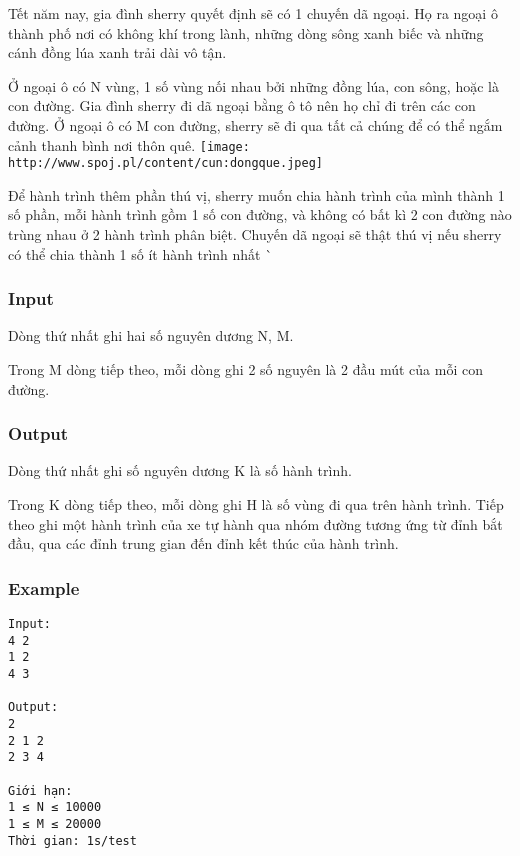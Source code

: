 



   Tết năm nay, gia đình sherry quyết định sẽ có 1 chuyến dã ngoại. Họ ra ngoại ô thành phố nơi có không khí trong lành, những dòng sông xanh biếc và những cánh đồng lúa xanh trải dài vô tận.  

   Ở ngoại ô có N vùng, 1 số vùng nối nhau bởi những đồng lúa, con sông, hoặc là con đường. Gia đình sherry đi dã ngoại bằng ô tô nên họ chỉ đi trên các con đường. Ở ngoại ô có M con đường, sherry sẽ đi qua tất cả chúng để có thể ngắm cảnh thanh bình nơi thôn quê.  
\texttt{[image: http://www.spoj.pl/content/cun:dongque.jpeg]}

   Để hành trình thêm phần thú vị, sherry muốn chia hành trình của mình thành 1 số phần, mỗi hành trình gồm 1 số con đường, và không có bất kì 2 con đường nào trùng nhau ở 2 hành trình phân biệt. Chuyến dã ngoại sẽ thật thú vị nếu sherry có thể chia thành 1 số ít hành trình nhất ^^  

\subsubsection{   Input  }

   Dòng thứ nhất ghi hai số nguyên dương N, M.  

   Trong M dòng tiếp theo, mỗi dòng ghi 2 số nguyên là 2 đầu mút của mỗi con đường.  

\subsubsection{   Output  }

   Dòng thứ nhất ghi số nguyên dương K là số hành trình.  

   Trong K dòng tiếp theo, mỗi dòng ghi H là số vùng đi qua trên hành trình. Tiếp theo ghi một hành trình của xe tự hành qua nhóm đường tương ứng từ đỉnh bắt đầu, qua các đỉnh trung gian đến đỉnh kết thúc của hành trình.  

\subsubsection{   Example  }
\begin{verbatim}
Input:
4 2
1 2
4 3

Output:
2
2 1 2
2 3 4

Giới hạn:
1 ≤ N ≤ 10000
1 ≤ M ≤ 20000
Thời gian: 1s/test
\end{verbatim}
